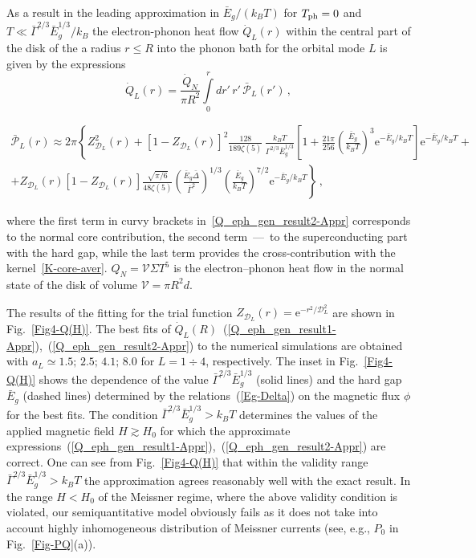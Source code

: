 \documentclass[prx,twocolumn,aps,superscriptaddress,showpacs,amsmath,amssymb,footnoteinbib]{revtex4-1}
\begin{document}
As a result in the leading approximation in $\bar{E}_g/(k_B T)$
for $T_{\rm ph} = 0$ and $T \ll \bar{\Gamma}^{2/3} \bar{E}_g^{1/3}/k_B$
the electron-phonon heat flow $\dot{Q}_L(r)$ within the central
part of the disk of the a radius $r \le R$ into the phonon bath
for the orbital mode $L$ is given by the expressions
%
\begin{equation}\label{Q_eph_gen_result1-Appr}
    \dot{Q}_L(r) =\frac{ \dot{Q}_N}{\pi R^2} \int\limits_0^r d r'\, r'\, \bar{\mathcal{P}}_L(r')\,,
\end{equation}
%
\begin{widetext}
\begin{multline}
   \bar{\mathcal{P}}_L(r) \approx 2\pi \left\{ Z_{\mathcal{D}_L}^2(r) +
    [1 - Z_{\mathcal{D}_L}(r)]^2 \frac{128}{189 \zeta(5)}\, \frac{k_B T}{\Gamma^{2/3} \bar{E}_g^{1/3}}
    \left[ 1 + \frac{21 \pi}{256} \left( \frac{\bar{E}_g}{k_B T} \right)^3 \mathrm{e}^{-\bar{E}_g / k_B T} \right]
                                \mathrm{e}^{-\bar{E}_g / k_B T} + \right. \\
        \left. + Z_{\mathcal{D}_L}(r) [1 - Z_{\mathcal{D}_L}(r)] \frac{\sqrt{\pi / 6}}{48 \zeta(5)}
            \left( \frac{\bar{E}_g \bar{\Delta}}{\bar{\Gamma}^2} \right)^{1/3}
            \left( \frac{\bar{E}_g}{k_B T} \right)^{7/2} \mathrm{e}^{-\bar{E}_g /  k_B T} \right\}\,,   \label{Q_eph_gen_result2-Appr}\
\end{multline}
%
\end{widetext}
where the first term in curvy brackets
in~\eqref{Q_eph_gen_result2-Appr} corresponds  to the normal core
contribution, the second term~---~to the superconducting part with
the hard gap, while the last term provides the cross-contribution
with the kernel~\eqref{K-core-aver}. $Q_N = \mathcal{V} \Sigma
T^5$ is the electron--phonon heat flow in the normal state of the
disk of volume $\mathcal{V} = \pi R^2 d$.
%

The results of the fitting for the trial function
$Z_{\mathcal{D}_L}(r) = \mathrm{e}^{-r^2 / \mathcal{D}_L^2}$ are
shown in Fig.~\ref{Fig4-Q(H)}. The best fits of
$\dot{Q}_L(R)$~(\ref{Q_eph_gen_result1-Appr}),~(\ref{Q_eph_gen_result2-Appr})
to the numerical simulations are obtained with $a_L \simeq
1.5;\,2.5;\,4.1;\,8.0$ for $L = 1 \div 4$, respectively. The inset
in Fig.~\ref{Fig4-Q(H)} shows the dependence of the value
$\bar{\Gamma}^{2/3} \bar{E}_g^{1/3}$ (solid lines) and the hard
gap $\bar{E}_g$ (dashed lines) determined by the
relations~(\ref{Eg-Delta}) on the magnetic flux $\phi$ for the
best fits. The condition $\bar{\Gamma}^{2/3} \bar{E}_g^{1/3} > k_B
T$ determines the values of the applied magnetic field $H \gtrsim
H_0$ for which the approximate
expressions~(\ref{Q_eph_gen_result1-Appr}),~(\ref{Q_eph_gen_result2-Appr})
are correct. One can see from Fig.~\ref{Fig4-Q(H)} that within the
validity range $\bar{\Gamma}^{2/3} \bar{E}_g^{1/3} > k_B T$ the
approximation agrees reasonably well with the exact result. In the
range $H<H_0$ of the Meissner regime, where the above validity
condition is violated, our semiquantitative model obviously fails
as it does not take into account highly inhomogeneous distribution
of Meissner currents (see, e.g., $P_0$ in Fig.~\ref{Fig-PQ}(a)).
\end{document}
